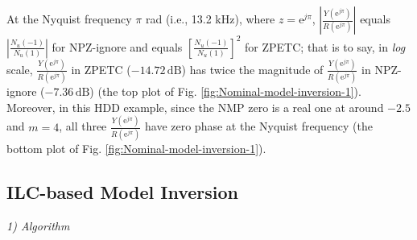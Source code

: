 \documentclass [11pt, proquest] {uwthesis}[2020/02/24]
\begin{document}
 At the Nyquist frequency $\pi$ rad (i.e., 13.2 kHz), where $z=\text{e}^{j\pi}$,
$\left|\frac{Y(\text{e}^{j\pi})}{R(\text{e}^{j\pi})}\right|$ equals
$\left|\frac{N_{u}(-1)}{N_{u}(1)}\right|$ for NPZ-ignore and equals
$\left[\frac{N_{u}(-1)}{N_{u}(1)}\right]^{2}$ for ZPETC; that is
to say, in \emph{log} scale, $\frac{Y(\text{e}^{j\pi})}{R(\text{e}^{j\pi})}$
in ZPETC ($-14.72\,\text{dB}$) has twice the magnitude of $\frac{Y(\text{e}^{j\pi})}{R(\text{e}^{j\pi})}$
in NPZ-ignore ($-7.36\,\text{dB}$) (the top plot of Fig. \ref{fig:Nominal-model-inversion-1}).
Moreover, in this HDD example, since the NMP zero is a real one at
around $-2.5$ and $m=4$, all three $\frac{Y(\text{e}^{j\pi})}{R(\text{e}^{j\pi})}$
have zero phase at the Nyquist frequency (the bottom plot of Fig.
\ref{fig:Nominal-model-inversion-1}).

\subsection{ILC-based Model Inversion}

\noindent \emph{1) Algorithm}
\end{document}

